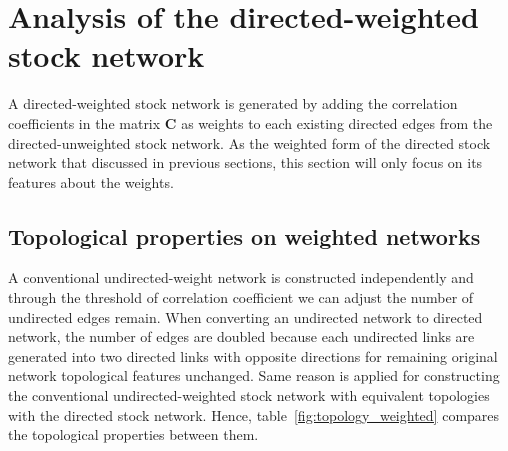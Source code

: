 \section{Analysis of the directed-weighted stock network}
A directed-weighted stock network is generated by adding the correlation coefficients in the matrix \textbf{C} as weights to each existing directed edges from the directed-unweighted stock network. As the weighted form of the directed stock network that discussed in previous sections, this section will only focus on its features about the weights.
\subsection{Topological properties on weighted networks}
A conventional undirected-weight network is constructed independently and through the threshold of correlation coefficient we can adjust the number of undirected edges remain. When converting an undirected network to directed network, the number of edges are doubled because each undirected links are generated into two directed links with opposite directions for remaining original network topological features unchanged. Same reason is applied for constructing the conventional undirected-weighted stock network with equivalent topologies with the directed stock network. Hence, table~\ref{fig:topology_weighted} compares the topological properties between them.

